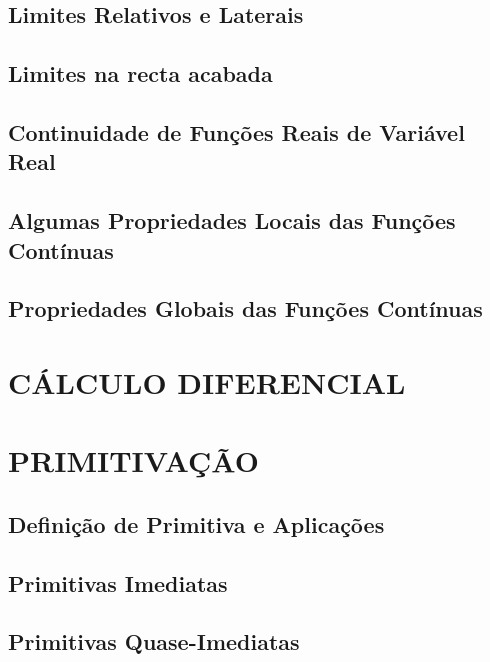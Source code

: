 \documentclass[11pt]{article}
\begin{document}
\subsection{Limites Relativos e Laterais}

\subsection{Limites na recta acabada}

\subsection{Continuidade de Funções Reais de Variável Real}

\subsection{Algumas Propriedades Locais das Funções Contínuas}

\subsection{Propriedades Globais das Funções Contínuas}



\newpage

\section{\MakeUppercase{Cálculo Diferencial}}



\newpage

\section{\MakeUppercase{Primitivação}}

\subsection{Definição de Primitiva e Aplicações}

\subsection{Primitivas Imediatas}

\subsection{Primitivas Quase-Imediatas}
\end{document}

